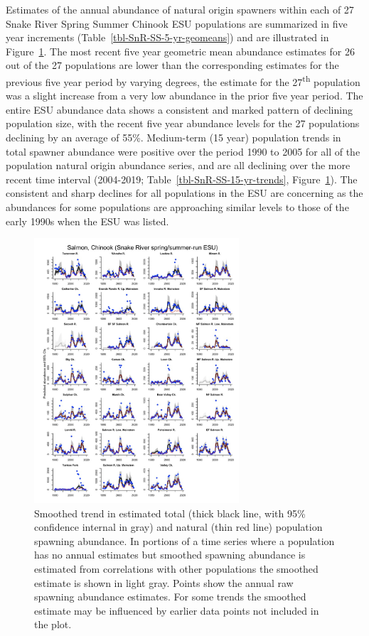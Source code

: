 \documentclass[
  letterpaper,
  oneside,
  open=any]{scrbook}
\begin{document}
Estimates of the annual abundance of natural origin spawners within each
of 27 Snake River Spring Summer Chinook ESU populations are summarized
in five year increments (Table~\ref{tbl-SnR-SS-5-yr-geomeans}) and are
illustrated in Figure~\ref{fig-SnR-SS-smoothed-trends}. The most recent
five year geometric mean abundance estimates for 26 out of the 27
populations are lower than the corresponding estimates for the previous
five year period by varying degrees, the estimate for the
27\textsuperscript{th} population was a slight increase from a very low
abundance in the prior five year period. The entire ESU abundance data
shows a consistent and marked pattern of declining population size, with
the recent five year abundance levels for the 27 populations declining
by an average of 55\%. Medium-term (15 year) population trends in total
spawner abundance were positive over the period 1990 to 2005 for all of
the population natural origin abundance series, and are all declining
over the more recent time interval (2004-2019;
Table~\ref{tbl-SnR-SS-15-yr-trends},
Figure~\ref{fig-SnR-SS-smoothed-trends}). The consistent and sharp
declines for all populations in the ESU are concerning as the abundances
for some populations are approaching similar levels to those of the
early 1990s when the ESU was listed.

\begin{figure}

{\centering \includegraphics[width=3in,height=\textheight]{content/Interior_Columbia/../../media/image25.jpg}

}

\caption{\label{fig-SnR-SS-smoothed-trends}Smoothed trend in estimated
total (thick black line, with 95\% confidence internal in gray) and
natural (thin red line) population spawning abundance. In portions of a
time series where a population has no annual estimates but smoothed
spawning abundance is estimated from correlations with other populations
the smoothed estimate is shown in light gray. Points show the annual raw
spawning abundance estimates. For some trends the smoothed estimate may
be influenced by earlier data points not included in the plot.}

\end{figure}
\end{document}
